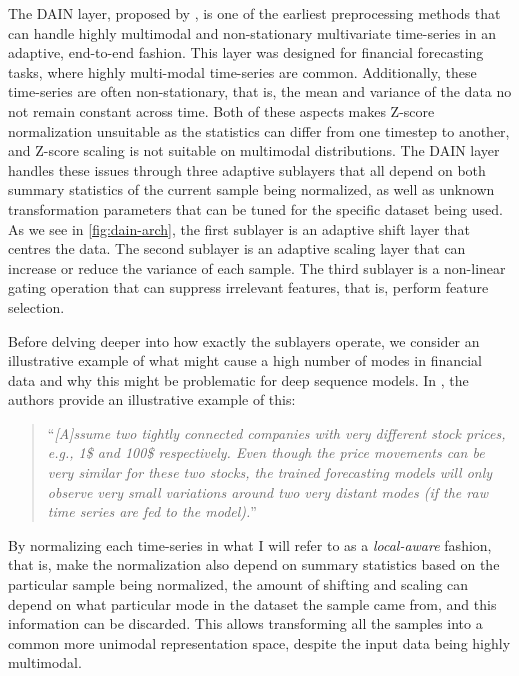 \documentclass{statsmsc}
\begin{document}
{The \acf{DAIN} layer, proposed by \cite{dain}, is one of the earliest preprocessing methods that can
handle highly multimodal and non-stationary multivariate time-series in an adaptive,
end-to-end fashion.
This layer was designed for financial forecasting tasks, where highly multi-modal
time-series are common. Additionally, these time-series are often non-stationary, that is, the
mean and variance of the data no not remain constant across time.
Both of these aspects makes Z-score normalization unsuitable as the statistics can differ
from one timestep to another, and Z-score scaling is not suitable on multimodal distributions.
The \ac{DAIN} layer handles these issues through three adaptive sublayers that all depend
on both summary statistics of the current sample being normalized, as well as unknown transformation
parameters that can be tuned for the specific dataset being used.
As we see in \cref{fig:dain-arch}, the first sublayer is an adaptive shift layer
that centres the data. The second sublayer is an adaptive scaling layer that can increase or
reduce the variance of each sample. The third sublayer is a non-linear gating operation
that can suppress irrelevant features, that is, perform feature selection.

Before delving deeper into how exactly the sublayers operate, we consider an illustrative
example of what might cause a high number of modes in financial data and why this might
be problematic for deep sequence models. In
\cite{dain}, the authors provide an illustrative example of this:
\begin{quote}
    ``\textit{[A]ssume two tightly
    connected companies with very different stock prices, e.g., 1\$
    and 100\$ respectively. Even though the price movements can
    be very similar for these two stocks, the trained forecasting
    models will only observe very small variations around two
    very distant modes (if the raw time series are fed to the model).}''
\end{quote}
By normalizing each time-series in what I will refer to as a
\textit{local-aware} fashion, that is, make the normalization also depend on summary statistics
based on the particular sample being normalized,
the amount of shifting and scaling can depend on what particular mode in the dataset the sample
came from, and this information can be discarded. This allows transforming all the samples into
a common more unimodal representation space, despite the input data being highly multimodal.

}
\end{document}
